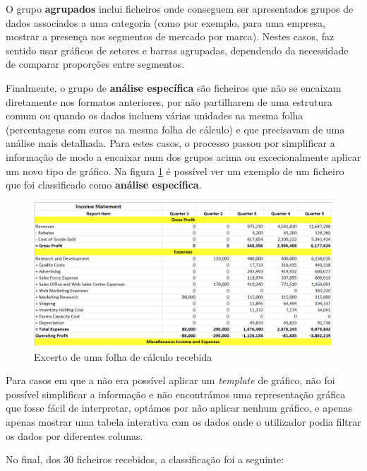 O grupo \textbf{agrupados} inclui ficheiros onde conseguem ser apresentados grupos de dados associados a uma categoria (como por exemplo, para uma empresa, mostrar a presença nos segmentos de mercado por marca). Nestes casos, faz sentido usar gráficos de setores e barras agrupadas, dependendo da necessidade de comparar proporções entre segmentos.

Finalmente, o grupo de \textbf{análise específica} são ficheiros que não se encaixam diretamente nos formatos anteriores, por não partilharem de uma estrutura comum ou quando os dados incluem várias unidades na mesma folha (percentagens com euros na mesma folha de cálculo) e que precisavam de uma análise mais detalhada. Para estes casos, o processo passou por simplificar a informação de modo a encaixar num dos grupos acima ou excecionalmente aplicar um novo tipo de gráfico. Na figura \ref{fig:before} é possível ver um exemplo de um ficheiro que foi classificado como \textbf{análise específica}.

\begin{figure}[H]
\centering
\includegraphics[max width=\textwidth]{./img/before}
\caption{Excerto de uma folha de cálculo recebida}
\label{fig:before}
\end{figure}

Para casos em que a não era possível aplicar um \textit{template} de gráfico, não foi possível simplificar a informação e não encontrámos uma representação gráfica que fosse fácil de interpretar, optámos por não aplicar nenhum gráfico, e apenas apenas mostrar uma tabela interativa com os dados onde o utilizador podia filtrar os dados por diferentes colunas.

No final, dos 30 ficheiros recebidos, a classificação foi a seguinte:

